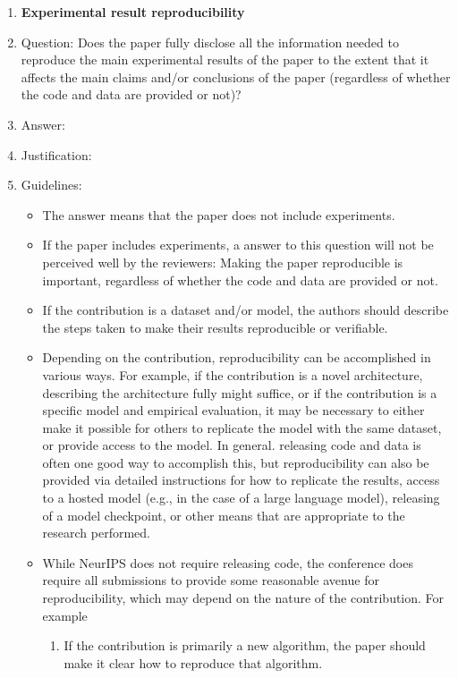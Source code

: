 \documentclass{article}
\begin{document}
\begin{enumerate}
    \item {\bf Experimental result reproducibility}
    \item[] Question: Does the paper fully disclose all the information needed to reproduce the main experimental results of the paper to the extent that it affects the main claims and/or conclusions of the paper (regardless of whether the code and data are provided or not)?
    \item[] Answer: \answerTODO{} %
    \item[] Justification: \justificationTODO{}
    \item[] Guidelines:
    \begin{itemize}
        \item The answer \answerNA{} means that the paper does not include experiments.
        \item If the paper includes experiments, a \answerNo{} answer to this question will not be perceived well by the reviewers: Making the paper reproducible is important, regardless of whether the code and data are provided or not.
        \item If the contribution is a dataset and\slash or model, the authors should describe the steps taken to make their results reproducible or verifiable.
        \item Depending on the contribution, reproducibility can be accomplished in various ways. For example, if the contribution is a novel architecture, describing the architecture fully might suffice, or if the contribution is a specific model and empirical evaluation, it may be necessary to either make it possible for others to replicate the model with the same dataset, or provide access to the model. In general. releasing code and data is often one good way to accomplish this, but reproducibility can also be provided via detailed instructions for how to replicate the results, access to a hosted model (e.g., in the case of a large language model), releasing of a model checkpoint, or other means that are appropriate to the research performed.
        \item While NeurIPS does not require releasing code, the conference does require all submissions to provide some reasonable avenue for reproducibility, which may depend on the nature of the contribution. For example
        \begin{enumerate}
            \item If the contribution is primarily a new algorithm, the paper should make it clear how to reproduce that algorithm.

\end{enumerate}
\end{itemize}
\end{enumerate}
\end{document}
